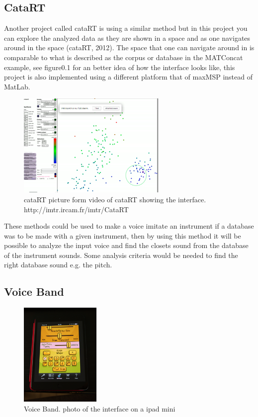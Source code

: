 \subsection{ CataRT }
Another project called cataRT is using a similar method but in this project you can explore the analyzed data as they are shown in a space and as one navigates around in the space (cataRT, 2012). The space that one can navigate around in is comparable to what is described as the corpus or database in the MATConcat example, see figure0.1 for an better idea of how the interface looks like, this project is also implemented using a different platform that of maxMSP instead of MatLab.\\
\begin{figure}[h]
	\begin{center}
		\includegraphics[height=5cm]{fig/cataRT.png}
		\caption{cataRT picture form video of cataRT showing the interface. http://imtr.ircam.fr/imtr/CataRT}
		\label{cataRT}
	\end{center}
\end{figure} 
These methods could be used to make a voice imitate an instrument if a database was to be made with a given instrument, then by using this method it will be possible to analyze the input voice and find the closets sound from the database of the instrument sounds. Some analysis criteria would be needed to find the right database sound e.g. the pitch. 

\subsection{ Voice Band }
\begin{figure}[h]
	\begin{center}
		\includegraphics[height=5cm]{fig/voiceband.png}
		\caption{Voice Band. photo of the interface on a ipad mini}
		\label{VoiceBand}
	\end{center}
\end{figure}

